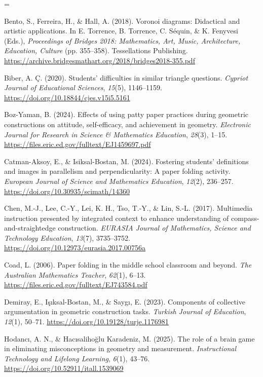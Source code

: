 \documentclass[a4paper,12pt]{article}
\begin{document}
{\TimesEn\linespread{1.0}\selectfont\fontsize{10.8pt}{16.2pt}\selectfont
\setlength{\parskip}{6.0pt}
\everypar={\hangindent=0.85cm }

Bento, S., Ferreira, H., \& Hall, A. (2018). Voronoi diagrams: Didactical and artistic applications. In E. Torrence, B. Torrence, C. Séquin, \& K. Fenyvesi (Eds.), \textit{Proceedings of Bridges 2018: Mathematics, Art, Music, Architecture, Education, Culture} (pp. 355--358). Tessellations Publishing. \url{https://archive.bridgesmathart.org/2018/bridges2018-355.pdf}

Biber, A. Ç. (2020). Students' difficulties in similar triangle questions. \textit{Cypriot Journal of Educational Sciences}, \textit{15}(5), 1146--1159. \url{https://doi.org/10.18844/cjes.v15i5.5161}

Boz-Yaman, B. (2024). Effects of using patty paper practices during geometric constructions on attitude, self-efficacy, and achievement in geometry. \textit{Electronic Journal for Research in Science \& Mathematics Education}, \textit{28}(3), 1--15. \url{https://files.eric.ed.gov/fulltext/EJ1459697.pdf}

Catman-Aksoy, E., \& Isiksal-Bostan, M. (2024). Fostering students’ definitions and images in parallelism and perpendicularity: A paper folding activity. \textit{European Journal of Science and Mathematics Education}, \textit{12}(2), 236--257. \url{https://doi.org/10.30935/scimath/14360}

Chen, M.-J., Lee, C.-Y., Lei, K. H., Tso, T.-Y., \& Lin, S.-L. (2017). Multimedia instruction presented by integrated context to enhance understanding of compass-and-straightedge construction. \textit{EURASIA Journal of Mathematics, Science and Technology Education}, \textit{13}(7), 3735--3752. \url{https://doi.org/10.12973/eurasia.2017.00756a}

Coad, L. (2006). Paper folding in the middle school classroom and beyond. \textit{The Australian Mathematics Teacher}, \textit{62}(1), 6--13. \url{https://files.eric.ed.gov/fulltext/EJ743584.pdf}

Demiray, E., Işıksal-Bostan, M., \& Saygı, E. (2023). Components of collective argumentation in geometric construction tasks. \textit{Turkish Journal of Education}, \textit{12}(1), 50--71. \url{https://doi.org/10.19128/turje.1176981}

Hodancı, A. N., \& Hacısalihoğlu Karadeniz, M. (2025). The role of a brain game in eliminating misconceptions in geometry and measurement. \textit{Instructional Technology and Lifelong Learning}, \textit{6}(1), 43--76. \url{https://doi.org/10.52911/itall.1539069}

}
\end{document}
